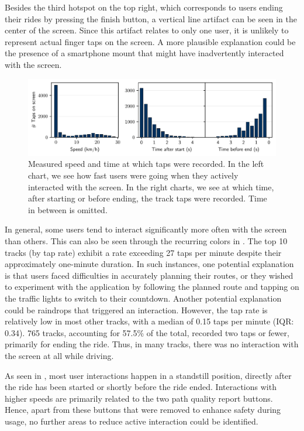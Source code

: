 Besides the third hotspot on the top right, which corresponds to users ending their rides by pressing the finish button, a vertical line artifact can be seen in the center of the screen. Since this artifact relates to only one user, it is unlikely to represent actual finger taps on the screen. A more plausible explanation could be the presence of a smartphone mount that might have inadvertently interacted with the screen.

\begin{figure}[t]
\caption{Measured speed and time at which taps were recorded. In the left chart, we see how fast users were going when they actively interacted with the screen. In the right charts, we see at which time, after starting or before ending, the track taps were recorded. Time in between is omitted.}\label{fig:app-user-interaction-speed}
\includegraphics[width=\linewidth]{images/app-user-interaction-speed.pdf}
\end{figure}

In general, some users tend to interact significantly more often with the screen than others. This can also be seen through the recurring colors in . The top 10 tracks (by tap rate) exhibit a rate exceeding 27 taps per minute despite their approximately one-minute duration. In such instances, one potential explanation is that users faced difficulties in accurately planning their routes, or they wished to experiment with the application by following the planned route and tapping on the traffic lights to switch to their countdown. Another potential explanation could be raindrops that triggered an interaction. However, the tap rate is relatively low in most other tracks, with a median of 0.15 taps per minute (IQR: 0.34). 765 tracks, accounting for 57.5\% of the total, recorded two taps or fewer, primarily for ending the ride. Thus, in many tracks, there was no interaction with the screen at all while driving.

As seen in , most user interactions happen in a standstill position, directly after the ride has been started or shortly before the ride ended. Interactions with higher speeds are primarily related to the two path quality report buttons. Hence, apart from these buttons that were removed to enhance safety during usage, no further areas to reduce active interaction could be identified.

